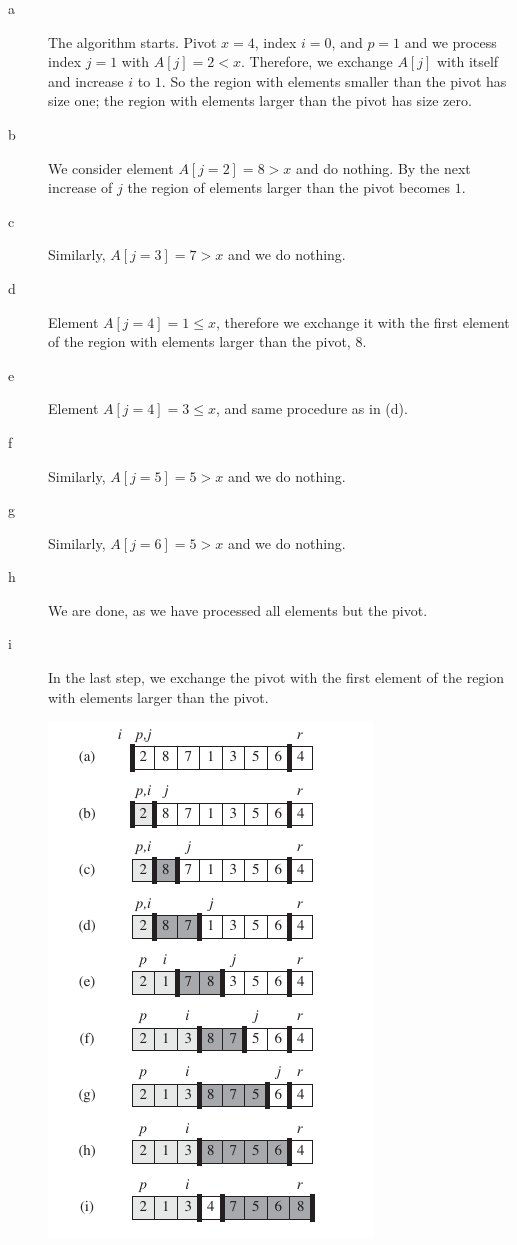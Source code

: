 \begin{description}
\item[a] The algorithm starts. Pivot $x = 4$, index $i=0$, and $p=1$ and we process index $j=1$ with $A[j]=2 < x$. Therefore, we exchange $A[j]$ with itself and increase $i$ to $1$. So the region with elements smaller than the pivot has size one; the region with elements larger than the pivot has size zero.

\item[b] We consider element $A[j=2]=8 > x$ and do nothing. By the next increase of $j$ the region of elements larger than the pivot becomes $1$.

\item[c] Similarly, $A[j=3]=7 > x$ and we do nothing.

\item[d] Element $A[j=4]=1 \leq x$, therefore we exchange it with the first element of the region with elements larger than the pivot, $8$.
  
\item[e] Element $A[j=4]=3 \leq x$, and same procedure as in (d).

\item[f] Similarly, $A[j=5]=5 > x$ and we do nothing.

\item[g] Similarly, $A[j=6]=5 > x$ and we do nothing.

\item[h] We are done, as we have processed all elements but the pivot.

\item[i] In the last step, we exchange the pivot with the first element of the region with elements larger than the pivot.

\end{description}

\begin{figure}[hbt!]
\centering
\includegraphics[scale=0.5]{images/quicksort_4.png}
\end{figure}



